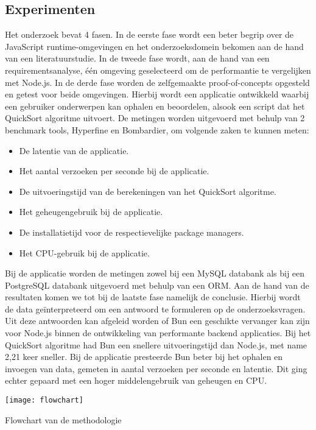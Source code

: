\documentclass[a0,portrait]{hogent-poster}
\begin{document}
\begin{multicols}{2}
\section{Experimenten}
Het onderzoek bevat 4 fasen. 
In de eerste fase wordt een beter begrip over de JavaScript runtime-omgevingen en het onderzoeksdomein bekomen aan de hand van een literatuurstudie.
In de tweede fase wordt, aan de hand van een requirementsanalyse, één omgeving geselecteerd om de performantie te vergelijken met Node.js.
In de derde fase worden de zelfgemaakte proof-of-concepts opgesteld en getest voor beide omgevingen. 
Hierbij wordt een applicatie ontwikkeld waarbij een gebruiker onderwerpen kan ophalen en beoordelen, alsook een script dat het QuickSort algoritme uitvoert.
De metingen worden uitgevoerd met behulp van 2 benchmark tools, Hyperfine en Bombardier, om volgende zaken te kunnen meten:
\begin{itemize}
    \item De latentie van de applicatie.
    \item Het aantal verzoeken per seconde bij de applicatie.
    \item De uitvoeringstijd van de berekeningen van het QuickSort algoritme.
    \item Het geheugengebruik bij de applicatie.
    \item De installatietijd voor de respectievelijke package managers.
    \item Het CPU-gebruik bij de applicatie.
\end{itemize}
Bij de applicatie worden de metingen zowel bij een MySQL databank als bij een PostgreSQL databank uitgevoerd met behulp van een ORM.
Aan de hand van de resultaten komen we tot bij de laatste fase namelijk de conclusie. Hierbij wordt de data geïnterpreteerd om een antwoord te formuleren op de onderzoeksvragen.
Uit deze antwoorden kan afgeleid worden of Bun een geschikte vervanger kan zijn voor Node.js binnen de ontwikkeling van performante backend applicaties.
Bij het QuickSort algoritme had Bun een snellere uitvoeringstijd dan Node.js, met name 2,21 keer sneller.
Bij de applicatie presteerde Bun beter bij het ophalen en invoegen van data, gemeten in aantal verzoeken per seconde en latentie.
Dit ging echter gepaard met een hoger middelengebruik van geheugen en CPU.
\begin{center}
  \captionsetup{type=figure}
  \begin{minipage}{0.23\textwidth}
    \centering
    \texttt{[image: flowchart]}
    \caption{Flowchart van de methodologie}

\end{minipage}
\end{center}
\end{multicols}
\end{document}
